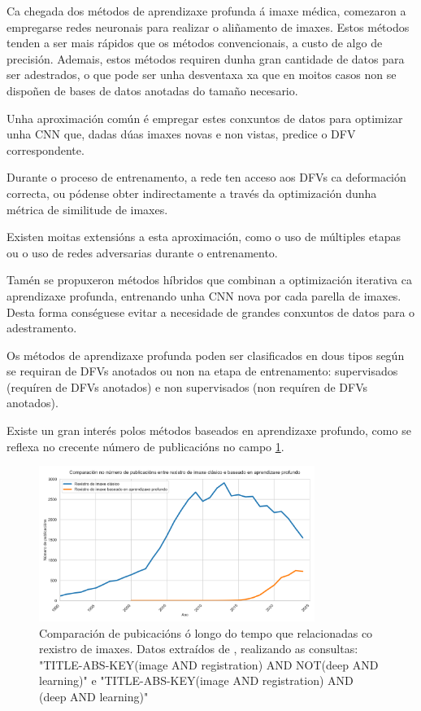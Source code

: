 Ca chegada dos métodos de aprendizaxe profunda á imaxe médica, comezaron a empregarse redes neuronais para realizar o aliñamento de imaxes.
Estos métodos tenden a ser mais rápidos que os métodos convencionais, a custo de algo de precisión. 
Ademais, estos métodos requiren dunha gran cantidade de datos para ser adestrados, 
o que pode ser unha desventaxa xa que en moitos casos non se dispoñen de bases de datos anotadas do tamaño necesario.

Unha aproximación común é empregar estes conxuntos de datos para optimizar unha CNN que,
 dadas dúas imaxes novas e non vistas, predice o DFV correspondente. \cite{defregcnn}

Durante o proceso de entrenamento, a rede ten acceso aos DFVs ca deformación correcta,
 ou pódense obter indirectamente a través da optimización dunha métrica de similitude de imaxes.

Existen moitas extensións a esta aproximación, como o uso de múltiples etapas ou o uso de redes adversarias durante o entrenamento.

Tamén se propuxeron métodos híbridos que combinan a optimización iterativa ca aprendizaxe profunda, 
entrenando unha CNN nova por cada parella de imaxes. Desta forma conséguese evitar a necesidade de grandes conxuntos de datos para o adestramento.

Os métodos de aprendizaxe profunda poden ser clasificados en dous tipos según se requiran de DFVs anotados ou non na etapa de entrenamento: 
supervisados (requíren de DFVs anotados) e non supervisados (non requíren de DFVs anotados). \cite{nie2024medicalimageregistrationapplication}

Existe un gran interés polos métodos baseados en aprendizaxe profundo, como se reflexa no crecente número de publicacións no campo \ref{fig:method_comp}.

\begin{figure}[hp!]
    \centering
    \includegraphics[width=0.8\textwidth]{imaxes/methods_comp.png}
    \caption{Comparación de pubicacións ó longo do tempo que relacionadas co rexistro de imaxes. Datos extraídos de \cite{scopus}, realizando as consultas: "TITLE-ABS-KEY(image AND registration) AND NOT(deep AND learning)" e "TITLE-ABS-KEY(image AND registration) AND (deep AND learning)"}
    \label{fig:method_comp}
\end{figure}

